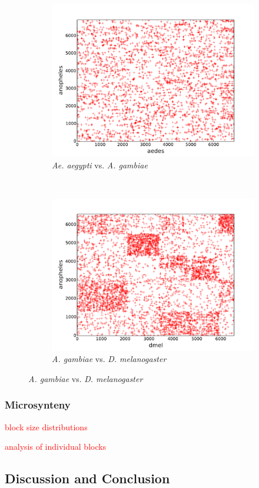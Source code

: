 \begin{figure}[H]
\begin{subfigure}[b]{0.45\textwidth}
    \includegraphics[width=\textwidth]{figures/synteny/aedes_anopheles_plot}
    \caption{\emph{Ae. aegypti} vs. \emph{A. gambiae}}
  \end{subfigure}
  ~
  \begin{subfigure}[b]{0.45\textwidth}
    \includegraphics[width=\textwidth]{figures/synteny/dmel_anopheles_plot}
    \caption{\emph{A. gambiae} vs. \emph{D. melanogaster}}
  \end{subfigure}
\label{fig:dot-plots}
\end{figure}

\subsubsection{Microsynteny}

\textcolor{red}{block size distributions}

\textcolor{red}{analysis of individual blocks}

\subsection{Discussion and Conclusion}